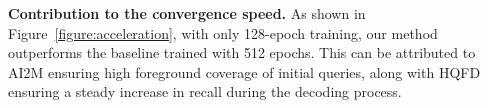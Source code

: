 \textbf{Contribution to the convergence speed.}
As shown in Figure~\ref{figure:acceleration}, with only 128-epoch training, our method outperforms the baseline trained with 512 epochs. This can be attributed to AI2M ensuring high foreground coverage of initial queries, along with HQFD ensuring a steady increase in recall during the decoding process.







